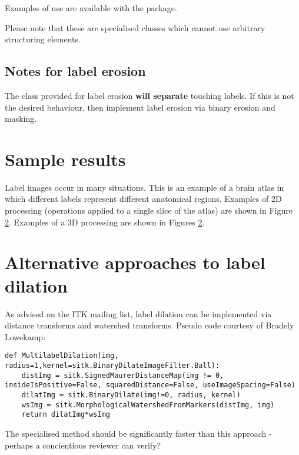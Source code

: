 \documentclass{InsightArticle}
\begin{document}
Examples of use are available with the package.

Please note that these are specialised classes which cannot use
arbitrary structuring elements.
\subsection{Notes for label erosion}
The class provided for label erosion {\bf will separate} touching
labels. If this is not the desired behaviour, then implement label
erosion via binary erosion and masking.

\section{Sample results}
Label images occur in many situations. This is an example of a brain
atlas in which different labels represent different anatomical
regions. Examples of 2D processing (operations applied to a single slice of the atlas) are shown in Figure \ref{}. Examples of a 3D processing are shown in Figures \ref{}.


\section{Alternative approaches to label dilation}
As advised on the ITK mailing list, label dilation can be implemented via distance transforms and watershed transforms. Pseudo code courtesy of Bradely Lowekamp:

\begin{lstlisting}
def MultilabelDilation(img, radius=1,kernel=sitk.BinaryDilateImageFilter.Ball):
    distImg = sitk.SignedMaurerDistanceMap(img != 0, insideIsPositive=False, squaredDistance=False, useImageSpacing=False)
    dilatImg = sitk.BinaryDilate(img!=0, radius, kernel)
    wsImg = sitk.MorphologicalWatershedFromMarkers(distImg, img)
    return dilatImg*wsImg
\end{lstlisting}

The specialised method should be significantly faster than this approach - perhaps a concientious reviewer can verify?



\nocite{ITKSoftwareGuide}
\end{document}
